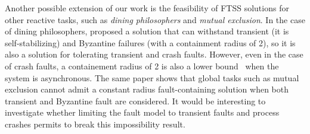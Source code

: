 \documentclass[11pt,english,letterpaper]{article}
\begin{document}
Another possible extension of our work is the feasibility of FTSS solutions for other reactive tasks, such as \emph{dining philosophers} and \emph{mutual exclusion}. In the case of dining philosophers, \cite{NA02c} proposed a solution that can withstand transient (it is self-stabilizing) and Byzantine failures (with a containment radius of 2), so it is also a solution for tolerating transient and crash faults. However, even in the case of crash faults, a containement radius of 2 is also a lower bound~\cite{PS04c} when the system is asynchronous. The same paper \cite{NA02c} shows that global tasks such as mutual exclusion cannot admit a constant radius fault-containing solution when both transient and Byzantine fault are considered. It would be interesting to investigate whether limiting the fault model to transient faults and process crashes permits to break this impossibility result.



\end{document}
